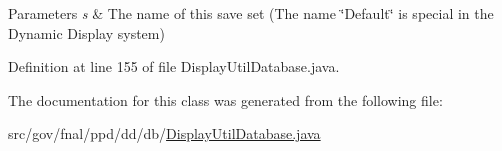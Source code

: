 \begin{DoxyParams}{Parameters}
{\em s} & The name of this save set (The name \char`\"{}\-Default\char`\"{} is special in the Dynamic Display system) \\
\hline
\end{DoxyParams}


Definition at line 155 of file Display\-Util\-Database.\-java.



The documentation for this class was generated from the following file\-:\begin{DoxyCompactItemize}
\item 
src/gov/fnal/ppd/dd/db/\hyperlink{DisplayUtilDatabase_8java}{Display\-Util\-Database.\-java}\end{DoxyCompactItemize}
